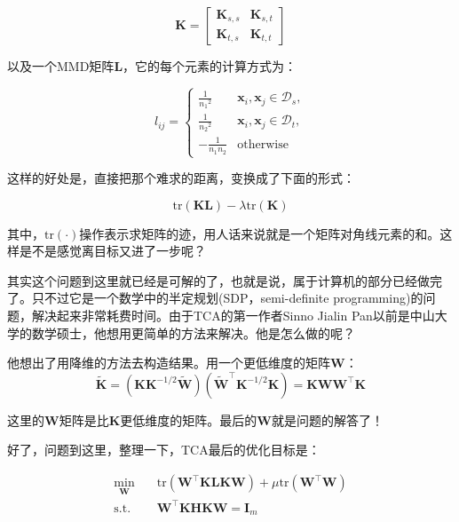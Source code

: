\begin{equation}
	\mathbf{K}=\begin{bmatrix}\mathbf{K}_{s,s} & \mathbf{K}_{s,t}\\\mathbf{K}_{t,s} & \mathbf{K}_{t,t}\end{bmatrix} 
\end{equation}

以及一个MMD矩阵$\mathbf{L}$，它的每个元素的计算方式为：

\begin{equation}
	l_{ij}=\begin{cases} \frac{1}{{n_1}^2} & \mathbf{x}_i,\mathbf{x}_j \in \mathcal{D}_s,\\ \frac{1}{{n_2}^2} & \mathbf{x}_i,\mathbf{x}_j \in \mathcal{D}_t,\\ -\frac{1}{n_1 n_2} & \text{otherwise} \end{cases}
\end{equation}

这样的好处是，直接把那个难求的距离，变换成了下面的形式：

\begin{equation}
	\mathrm{tr}(\mathbf{KL})-\lambda \mathrm{tr}(\mathbf{K})
\end{equation}

其中，$\mathrm{tr}(\cdot)$操作表示求矩阵的迹，用人话来说就是一个矩阵对角线元素的和。这样是不是感觉离目标又进了一步呢？

其实这个问题到这里就已经是可解的了，也就是说，属于计算机的部分已经做完了。只不过它是一个数学中的半定规划(SDP，semi-definite programming)的问题，解决起来非常耗费时间。由于TCA的第一作者Sinno Jialin Pan以前是中山大学的数学硕士，他想用更简单的方法来解决。他是怎么做的呢？

他想出了用降维的方法去构造结果。用一个更低维度的矩阵$\mathbf{W}$：
\begin{equation}
	\widetilde{\mathbf{K}}=({\mathbf{K}}{\mathbf{K}}^{-1/2}\widetilde{\mathbf{W}})(\widetilde{\mathbf{W}}^{\top}{\mathbf{K}}^{-1/2}{\mathbf{K}})={\mathbf{K}}\mathbf{W} \mathbf{W}^{\top}{\mathbf{K}}
\end{equation}

这里的$\mathbf{W}$矩阵是比$\mathbf{K}$更低维度的矩阵。最后的$\mathbf{W}$就是问题的解答了！

好了，问题到这里，整理一下，TCA最后的优化目标是：

\begin{equation}
	\begin{split} \min_\mathbf{W} \quad& \mathrm{tr}(\mathbf{W}^\top \mathbf{K} \mathbf{L} \mathbf{K} \mathbf{W}) + \mu \mathrm{tr}(\mathbf{W}^\top \mathbf{W})\\ \text{s.t.} \quad & \mathbf{W}^\top \mathbf{K} \mathbf{H} \mathbf{K} \mathbf{W} = \mathbf{I}_m \end{split} 
\end{equation}

